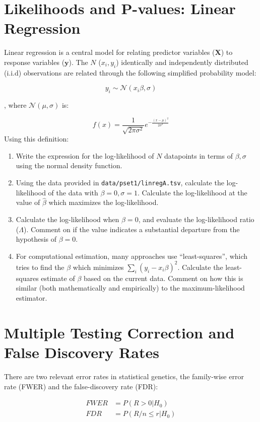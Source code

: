 \documentclass{pset}
\begin{document}
\section*{Likelihoods and P-values: Linear Regression}

Linear regression is a central model for relating predictor variables ($\mathbf{X}$) to response variables ($\mathbf{y}$). The $N$ ($x_i, y_i$) identically and independently distributed (i.i.d) observations are related through the following simplified probability model: 

$$y_i \sim \mathcal{N}(x_i\beta, \sigma)$$ 

, where $\mathcal{N}(\mu, \sigma)$ is:

$$f(x) = \frac{1}{\sqrt{2\pi\sigma^2}}e^{-\frac{(x - \mu)^2}{2\sigma^2}} $$
Using this definition:

\begin{enumerate}
\item Write the expression for the log-likelihood of $N$ datapoints in terms of $\beta, \sigma$ using the normal density function.
\item Using the data provided in \texttt{data/pset1/linregA.tsv}, calculate the log-likelihood of the data with $\beta = 0,\sigma=1$. Calculate the log-likelihood at the value of $\hat{\beta}$ which maximizes the log-likelihood. 
\item Calculate the log-likelihood when $\beta = 0$, and evaluate the log-likelihood ratio ($\Lambda$). Comment on if the value indicates a substantial departure from the hypothesis of $\beta = 0$.
\item For computational estimation, many approaches use ``least-squares'', which tries to find the $\beta$ which minimizes $\sum_i (y_i - x_i\beta)^2$. Calculate the least-squares estimate of $\beta$ based on the current data. Comment on how this is similar (both mathematically and empirically) to the maximum-likelihood estimator.
\end{enumerate}

\section*{Multiple Testing Correction and False Discovery Rates}

There are two relevant error rates in statistical genetics, the family-wise error rate (FWER) and the false-discovery rate (FDR):

$$
\begin{aligned}
FWER &= P(R > 0 | H_0)\\
FDR &= P(R/n \leq r | H_0)\\
\end{aligned}
$$
\end{document}

